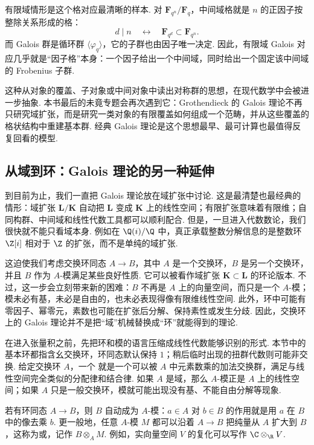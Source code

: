 有限域情形是这个格对应最清晰的样本. 对 $\mathbf{F}_{q^n}/\mathbf{F}_q$，中间域格就是 $n$ 的正因子按整除关系形成的格：
\[
    d\mid n
    \quad\longleftrightarrow\quad
    \mathbf{F}_{q^d}\subset\mathbf{F}_{q^n}.
\]
而 Galois 群是循环群 $\langle\varphi_q\rangle$，它的子群也由因子唯一决定. 因此，有限域 Galois 对应几乎就是``因子格''本身：一个因子给出一个中间域，同时给出一个固定该中间域的 Frobenius 子群.

这种从对象的覆盖、子对象或中间对象中读出对称群的思想，在现代数学中会被进一步抽象. 本书最后的未竟专题会再次遇到它：Grothendieck 的 Galois 理论不再只研究域扩张，而是研究一类对象的有限覆盖如何组成一个范畴，并从这些覆盖的格状结构中重建基本群. 经典 Galois 理论是这个思想最早、最可计算也最值得反复回看的模型.

\subsection{从域到环：Galois 理论的另一种延伸}

到目前为止，我们一直把 Galois 理论放在域扩张中讨论. 这是最清楚也最经典的情形：域扩张 $\mathbf{L}/\mathbf{K}$ 自动把 $\mathbf{L}$ 变成 $\mathbf{K}$ 上的线性空间；有限扩张意味着有限维；自同构群、中间域和线性代数工具都可以顺利配合. 但是，一旦进入代数数论，我们很快就不能只看域本身. 例如在 $\Q(i)/\Q$ 中，真正承载整数分解信息的是整数环 $\Z[i]$ 相对于 $\Z$ 的扩张，而不是单纯的域扩张.

这迫使我们考虑交换环同态 $A\to B$，其中 $A$ 是一个交换环，$B$ 是另一个交换环，并且 $B$ 作为 $A$-模满足某些良好性质. 它可以被看作域扩张 $\mathbf{K}\subset\mathbf{L}$ 的环论版本. 不过，这一步会立刻带来新的困难：$B$ 不再是 $A$ 上的向量空间，而只是一个 $A$-模；模未必有基，未必是自由的，也未必表现得像有限维线性空间. 此外，环中可能有零因子、幂零元，素数也可能在扩张后分解、保持素性或发生分歧. 因此，交换环上的 Galois 理论并不是把``域''机械替换成``环''就能得到的理论.

在进入张量积之前，先把环和模的语言压缩成线性代数能够识别的形式. 本节中的基本环都指含幺交换环，环同态默认保持 $1$；稍后临时出现的扭群代数则可能非交换. 给定交换环 $A$，一个 就是一个可以被 $A$ 中元素数乘的加法交换群，满足与线性空间完全类似的分配律和结合律. 如果 $A$ 是域，那么 $A$-模正是 $A$ 上的线性空间；如果 $A$ 只是一般交换环，模就可能出现没有基、不能自由分解等现象.

若有环同态 $A\to B$，则 $B$ 自动成为 $A$-模：$a\in A$ 对 $b\in B$ 的作用就是用 $a$ 在 $B$ 中的像去乘 $b$. 更一般地，任意 $A$-模 $M$ 都可以沿着 $A\to B$ 把纯量从 $A$ 扩大到 $B$，这称为或，记作 $B\otimes_A M$. 例如，实向量空间 $V$ 的复化可以写作 $\C\otimes_\R V$.

